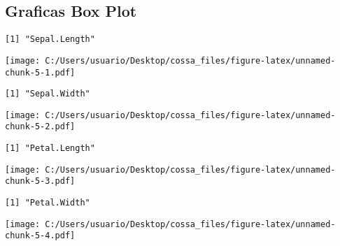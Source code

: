 \documentclass[]{article}
\begin{document}
\subsection{Graficas Box Plot}\label{graficas-box-plot}

\begin{verbatim}
[1] "Sepal.Length"
\end{verbatim}

\texttt{[image: C:/Users/usuario/Desktop/cossa\_files/figure-latex/unnamed-chunk-5-1.pdf]}

\begin{verbatim}
[1] "Sepal.Width"
\end{verbatim}

\texttt{[image: C:/Users/usuario/Desktop/cossa\_files/figure-latex/unnamed-chunk-5-2.pdf]}

\begin{verbatim}
[1] "Petal.Length"
\end{verbatim}

\texttt{[image: C:/Users/usuario/Desktop/cossa\_files/figure-latex/unnamed-chunk-5-3.pdf]}

\begin{verbatim}
[1] "Petal.Width"
\end{verbatim}

\texttt{[image: C:/Users/usuario/Desktop/cossa\_files/figure-latex/unnamed-chunk-5-4.pdf]}
\end{document}
